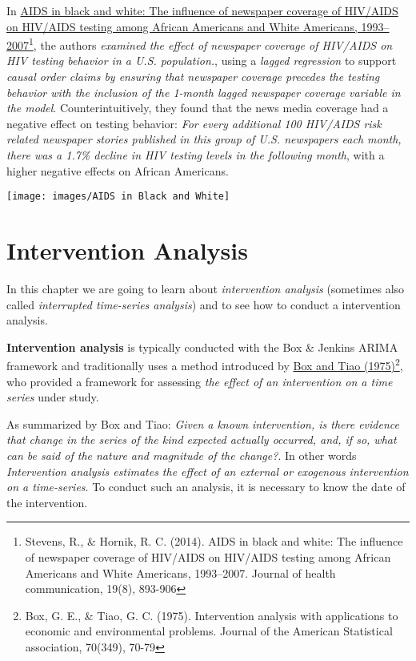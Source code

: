 \documentclass[
]{article}
\begin{document}
In \href{https://www.ncbi.nlm.nih.gov/pmc/articles/PMC4126885/}{AIDS in black and white: The influence of newspaper coverage of HIV/AIDS on HIV/AIDS testing among African Americans and White Americans, 1993--2007}\footnote{Stevens, R., \& Hornik, R. C. (2014). AIDS in black and white: The influence of newspaper coverage of HIV/AIDS on HIV/AIDS testing among African Americans and White Americans, 1993--2007. Journal of health communication, 19(8), 893-906}, the authors \emph{examined the effect of newspaper coverage of HIV/AIDS on HIV testing behavior in a U.S. population.}, using a \emph{lagged regression} to support \emph{causal order claims by ensuring that newspaper coverage precedes the testing behavior with the inclusion of the 1-month lagged newspaper coverage variable in the model}. Counterintuitively, they found that the news media coverage had a negative effect on testing behavior: \emph{For every additional 100 HIV/AIDS risk related newspaper stories published in this group of U.S. newspapers each month, there was a 1.7\% decline in HIV testing levels in the following month}, with a higher negative effects on African Americans.

\texttt{[image: images/AIDS in Black and White]}

\section{Intervention Analysis}\label{intervention-analysis}

In this chapter we are going to learn about \emph{intervention analysis} (sometimes also called \emph{interrupted time-series analysis}) and to see how to conduct a intervention analysis.

\textbf{Intervention analysis} is typically conducted with the Box \& Jenkins ARIMA framework and traditionally uses a method introduced by \href{https://www.jstor.org/stable/pdf/2285379.pdf}{Box and Tiao (1975)}\footnote{Box, G. E., \& Tiao, G. C. (1975). Intervention analysis with applications to economic and environmental problems. Journal of the American Statistical association, 70(349), 70-79}, who provided a framework for assessing \emph{the effect of an intervention on a time series} under study.

As summarized by Box and Tiao: \emph{Given a known intervention, is there evidence that change in the series of the kind expected actually occurred, and, if so, what can be said of the nature and magnitude of the change?}. In other words \emph{Intervention analysis estimates the effect of an external or exogenous intervention on a time-series}. To conduct such an analysis, it is necessary to know the date of the intervention.
\end{document}
